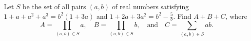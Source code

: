 Let $S$ be the set of all pairs $(a,b)$ of real numbers satisfying $1+a+a^2+a^3 = b^2(1+3a)$ and $1+2a+3a^2 = b^2 - \frac{5}{b}$. Find $A+B+C$, where \[ 
A = \prod_{(a,b) \in S} a
, \quad
B = \prod_{(a,b) \in S} b
, \quad \text{and} \quad
C =  \sum_{(a,b) \in S} ab.
\]
